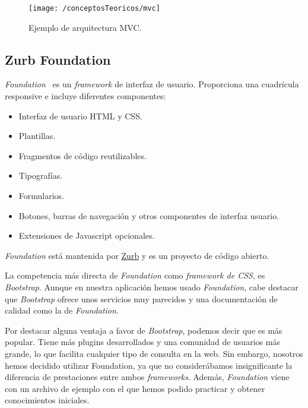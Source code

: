 \begin{figure}[ht]
	\centering
	\texttt{[image: /conceptosTeoricos/mvc]}
	\caption{Ejemplo de arquitectura MVC.}
	\label{fig:mvc}
\end{figure}

\subsection{Zurb Foundation}

\textit{Foundation}~\cite{web:foundation} es un \textit{framework} de interfaz de usuario. Proporciona una cuadrícula responsive e incluye diferentes componentes:
\begin{itemize}
	\item Interfaz de usuario HTML y CSS.
	\item Plantillas.
	\item Fragmentos de código reutilizables.
	\item Tipografías.
	\item Formularios.
	\item Botones, barras de navegación y otros componentes de interfaz usuario.
	\item Extensiones de Javascript opcionales.
\end{itemize}

\textit{Foundation} está mantenida por \href{zurb.com}{Zurb} y es un proyecto de código abierto.

La competencia más directa de \textit{Foundation} como \textit{framework de CSS}, es \textit{Bootstrap}. Aunque en nuestra aplicación hemos usado \textit{Foundation}, cabe destacar que \textit{Bootstrap} ofrece unos servicios muy parecidos y una documentación de calidad como la de \textit{Foundation}. 

Por destacar alguna ventaja a favor de \textit{Bootstrap}, podemos decir que es más popular. Tiene más plugins desarrollados y una comunidad de usuarios más grande, lo que facilita cualquier tipo de consulta en la web. Sin embargo, nosotros hemos decidido utilizar Foundation, ya que no considerábamos insignificante la diferencia de prestaciones entre ambos \textit{frameworks}. Además, \textit{Foundation} viene con un archivo de ejemplo con el que hemos podido practicar y obtener conocimientos iniciales.
